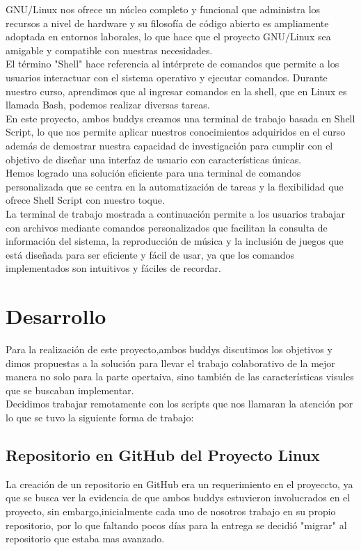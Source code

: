 \documentclass{article}
\begin{document}
GNU/Linux nos ofrece un núcleo completo y funcional que administra los recursos a nivel de hardware y su filosofía de código abierto es ampliamente adoptada en entornos laborales, lo que hace que el proyecto GNU/Linux sea amigable y compatible con nuestras necesidades.\\

El término "Shell" hace referencia al intérprete de comandos que permite a los usuarios interactuar con el sistema operativo y ejecutar comandos. Durante nuestro curso, aprendimos que al ingresar comandos en la shell, que en Linux es llamada Bash, podemos realizar diversas tareas.\\

En este proyecto, ambos buddys creamos una terminal de trabajo basada en Shell Script, lo que nos permite aplicar nuestros conocimientos adquiridos en el curso además de demostrar nuestra capacidad de investigación para cumplir con el objetivo de diseñar una interfaz de usuario con características únicas.\\

Hemos logrado una solución eficiente para una terminal de comandos personalizada que se centra en la automatización de tareas y la flexibilidad que ofrece Shell Script con nuestro toque.\\

La terminal de trabajo mostrada a continuación permite a los usuarios trabajar con archivos mediante comandos personalizados que facilitan la consulta de información del sistema, la reproducción de música y la inclusión de juegos que está diseñada para ser eficiente y fácil de usar, ya que los comandos implementados son intuitivos y fáciles de recordar.  

\newpage
\section*{Desarrollo}
Para la realización de este proyecto,ambos buddys discutimos los objetivos y dimos propuestas a la solución para llevar el trabajo colaborativo de la mejor manera no solo para la parte opertaiva, sino también de las características visules que se buscaban implementar.\\

Decidimos trabajar remotamente con los scripts que nos llamaran la atención por lo que se tuvo la siguiente forma de trabajo:

\subsection*{Repositorio en GitHub del Proyecto Linux}
La creación de un repositorio en GitHub era un requerimiento en el proyeccto, ya que se busca ver la evidencia de que ambos buddys estuvieron involucrados en el proyecto, sin embargo,inicialmente cada uno de nosotros trabajo en su propio repositorio, por lo que faltando pocos días para la entrega se decidió "migrar" al repositorio que estaba mas avanzado.
\end{document}
